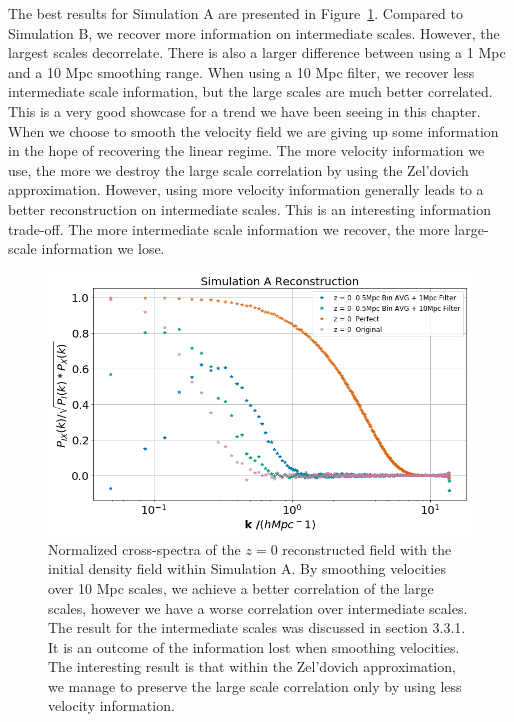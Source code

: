 The best results for Simulation A are presented in Figure~\ref{fig:4.6}. Compared to Simulation B, we recover more information on intermediate scales. However, the largest scales decorrelate. There is also a larger difference between using a 1 Mpc and a 10 Mpc smoothing range. When using a 10 Mpc filter, we recover less intermediate scale information, but the large scales are much better correlated. This is a very good showcase for a trend we have been seeing in this chapter. When we choose to smooth the velocity field we are giving up some information in the hope of recovering the linear regime. The more velocity information we use, the more we destroy the large scale correlation by using the Zel'dovich approximation. However, using more velocity information generally leads to a better reconstruction on intermediate scales. This is an interesting information trade-off. The more intermediate scale information we recover, the more large-scale information we lose.


\begin{figure}
    \centering
    \includegraphics[width=1\columnwidth]{images/realRecon/simARecon.png}%
    
    \caption{
        Normalized cross-spectra of the $z=0$ reconstructed field with the initial density field within Simulation A. By smoothing velocities over 10 Mpc scales, we achieve a better correlation of the large scales, however we have a worse correlation over intermediate scales. The result for the intermediate scales was discussed in section 3.3.1. It is an outcome of the information lost when smoothing velocities. The interesting result is that within the Zel'dovich approximation, we manage to preserve the large scale correlation only by using less velocity information.
    }
    
    \label{fig:4.6}
\end{figure}

